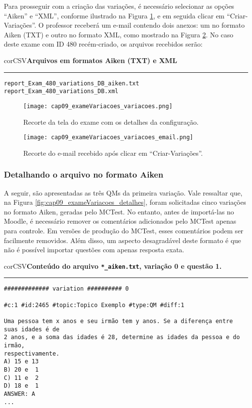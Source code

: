 Para prosseguir com a criação das variações, é necessário selecionar as opções ``Aiken'' e ``XML'', conforme ilustrado na Figura \ref{fig:cap09_exameVariacoes_variacoes}, e em seguida clicar em ``Criar-Variações''. O professor receberá um e-mail contendo dois anexos: um no formato Aiken (TXT) e outro no formato XML, como mostrado na Figura \ref{fig:cap09_xameVariacoes_variacoes_email}. No caso deste exame com ID 480 recém-criado, os arquivos recebidos serão:\\

\begin{myboxCode}{corCSV}{\textbf{Arquivos em formatos Aiken (TXT) e XML}}\vspace{3mm}
\hrule
{\footnotesize
\begin{verbatim}
report_Exam_480_variations_DB_aiken.txt
report_Exam_480_variations_DB.xml
\end{verbatim}
}
\end{myboxCode}

\begin{figure}[!ht]
\centering
  \texttt{[image: cap09\_exameVariacoes\_variacoes.png]}
  \caption{Recorte da tela do exame com os detalhes da configuração.}
  \label{fig:cap09_exameVariacoes_variacoes}
\end{figure}

\begin{figure}[!ht]
\centering
  \texttt{[image: cap09\_exameVariacoes\_variacoes\_email.png]}
  \caption{Recorte do e-mail recebido após clicar em ``Criar-Variações''.}
  \label{fig:cap09_xameVariacoes_variacoes_email}
\end{figure}

\subsubsection{Detalhando o arquivo no formato Aiken}

A seguir, são apresentadas as três QMs da primeira variação. Vale ressaltar que, na Figura \ref{fig:cap09_exameVariacoes_detalhes}, foram solicitadas cinco variações no formato Aiken, geradas pelo MCTest. No entanto, antes de importá-las no Moodle, é necessário remover os comentários adicionados pelo MCTest apenas para controle. Em versões de produção do MCTest, esses comentários podem ser facilmente removidos. Além disso, um aspecto desagradável deste formato é que não é possível importar questões com apenas resposta exata.

\begin{myboxCode}{corCSV}{\textbf{Conteúdo do arquivo \texttt{*\_aiken.txt}, variação 0 e questão 1.}}\vspace{3mm}
\hrule
\begin{verbatim}
############# variation ########## 0

#c:1 #id:2465 #topic:Topico Exemplo #type:QM #diff:1

Uma pessoa tem x anos e seu irmão tem y anos. Se a diferença entre suas idades é de 
2 anos, e a soma das idades é 28, determine as idades da pessoa e do irmão,
respectivamente. 
A) 15 e 13
B) 20 e  1
C) 11 e  2
D) 18 e  1
ANSWER: A
...
\end{verbatim}
\end{myboxCode}

